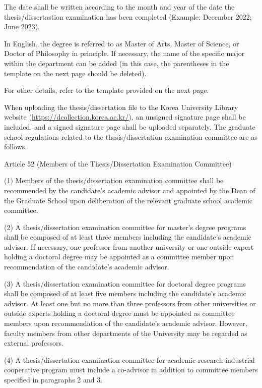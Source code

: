 \documentclass[11pt]{report}
\numberwithin{figure}{chapter}
\theoremstyle{plain}
\theoremstyle{definition}
\theoremstyle{corollary}
\theoremstyle{definition}
\theoremstyle{plain}
\theoremstyle{definition}
\theoremstyle{plain}
\begin{document}
\bigskip

The date shall be written according to the month and year of the date the thesis/dissertastion examination has been completed
(Example: December 2022; June 2023).

In English, the degree is referred to as Master of Arts, Master of Science, or Doctor of Philosophy in principle.
If necessary, the name of the specific major within the department can be added (in this case, the parentheses in the template on the next page should be deleted).

For other details, refer to the template provided on the next page.

When uploading the thesis/dissertation file to the Korea University Library website (\url{https://dcollection.korea.ac.kr/}), an unsigned signature page shall be included, and a signed signature page shall be uploaded separately.
The graduate school regulations related to the thesis/dissertation examination committee are as follows.

\bigskip

Article 52 (Members of the Thesis/Dissertation Examination Committee)

(1) Members of the thesis/dissertation examination committee shall be recommended by the candidate’s academic advisor and appointed by the Dean of the Graduate School upon deliberation of the relevant graduate school academic committee.

(2) A thesis/dissertation examination committee for master’s degree programs shall be composed of at least three members including the candidate’s academic advisor.
If necessary, one professor from another university or one outside expert holding a doctoral degree may be appointed as a committee member upon recommendation of the candidate’s academic advisor.

(3) A thesis/dissertation examination committee for doctoral degree programs shall be composed of at least five members including the candidate’s academic advisor.
At least one but no more than three professors from other universities or outside experts holding a doctoral degree must be appointed as committee members upon recommendation of the candidate’s academic advisor.
However, faculty members from other departments of the University may be regarded as external professors.

(4) A thesis/dissertation examination committee for academic-research-industrial cooperative program must include a co-advisor in addition to committee members specified in paragraphs 2 and 3.
\end{document}

